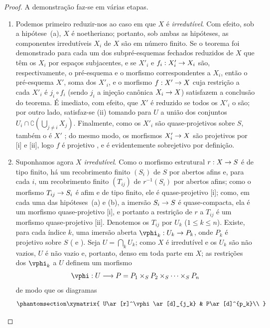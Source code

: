 \documentclass[oneside,10pt]{amsart}
\makeatletter
\renewcommand{\leq}{\leqslant}
\newcommand{\ega@arrow}[2]{\mathchoice{#1}{#2}{#2}{#2}}
\renewcommand{\to}{\ega@arrow{\longrightarrow}{\rightarrow}}
\newcommand{\oldpage}[2][]{\marginnote{\normalfont\footnotesize\textbf{#1}~|~#2}\ignorespaces}
\let\EGAOriginalLabel\label
\renewcommand{\label}[1]{\phantomsection\EGAOriginalLabel{#1}}
\makeatother
\begin{document}
\begin{proof}
A demonstração faz-se em várias etapas.
\begin{enumerate}
  \item[(A)] Podemos primeiro reduzir-nos ao caso em que $X$ é \emph{irredutível}.
    Com efeito, sob a hipótese~(a), $X$ é noetheriano; portanto, sob ambas as hipóteses, as componentes irredutíveis $X_i$ de $X$ são em número finito.
    Se o teorema foi demonstrado para cada um dos subpré-esquemas fechados reduzidos de $X$ que têm os $X_i$ por espaços subjacentes, e se $X'_i$ e $f_i:X'_i\to X_i$ são, respectivamente, o pré-esquema e o morfismo correspondentes a $X_i$, então o pré-esquema $X'$, soma dos $X'_i$, e o morfismo $f:X'\to X$ cuja restrição a cada $X'_i$ é $j_i\circ f_i$ (sendo $j_i$ a injeção canônica $X_i\to X$) satisfazem a conclusão do teorema.
    É imediato, com efeito, que $X'$ é reduzido se todos os $X'_i$ o são; por outro lado, satisfaz-se (ii) tomando para $U$ a união dos conjuntos $U_i\cap\complement\left(\bigcup_{j\neq i}X_j\right)$.
    Finalmente, como os $X'_i$ são quase-projetivos sobre $S$, também o é $X'$
\oldpage[II]{107}
    ; do mesmo modo, os morfismos $X'_i\to X$ são projetivos por [i] e [ii], logo $f$ é projetivo , e é evidentemente sobrejetivo por definição.
  \item[(B)] Suponhamos agora $X$ \emph{irredutível}.
    Como o morfismo estrutural $r:X\to S$ é de tipo finito, há um recobrimento finito $(S_i)$ de $S$ por abertos afins e, para cada $i$, um recobrimento finito $(T_{ij})$ de $r^{-1}(S_i)$ por abertos afins; como o morfismo $T_{ij}\to S_i$ é afim e de tipo finito, ele é quase-projetivo [i];
    como, em cada uma das hipóteses~(a) e (b), a imersão $S_i\to S$ é quase-compacta, ela é um morfismo quase-projetivo [i], e portanto a restrição de $r$ a $T_{ij}$ é um morfismo quase-projetivo [ii].
    Denotemos os $T_{ij}$ por $U_k$ ($1\leq k\leq n$).
    Existe, para cada índice $k$, uma imersão aberta $\vphi_k:U_k\to P_k$, onde $P_k$ é projetivo sobre $S$ ( e ).
    Seja $U=\bigcap_k U_k$; como $X$ é irredutível e os $U_k$ são não vazios, $U$ é não vazio e, portanto, denso em toda parte em $X$; as restrições dos $\vphi_k$ a $U$ definem um morfismo
    \[
      \vphi:U\to P=P_1\times_S P_2\times_S\cdots\times_S P_n
    \]
    de modo que os diagramas
    \[
    \label{II.5.6.1.1}
      \xymatrix{
        U\ar[r]^\vphi\ar[d]_{j_k} &
        P\ar[d]^{p_k}\\
}\]
\end{enumerate}
\end{proof}
\end{document}
